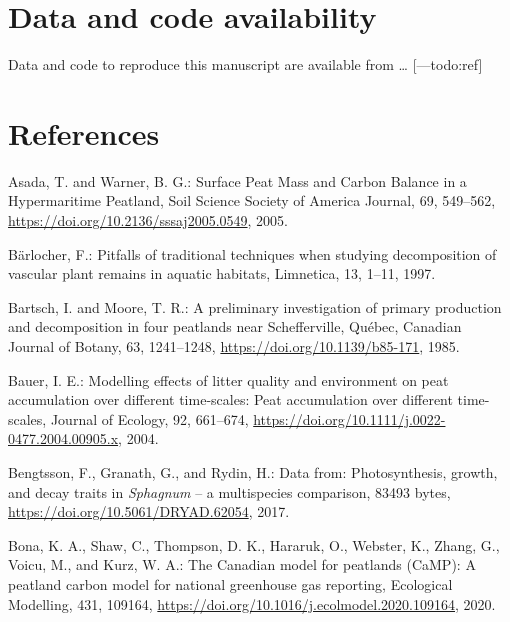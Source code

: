 \documentclass[
  12pt,
]{article}
\newlength{\cslhangindent}
\newlength{\cslentryspacingunit} %
\newenvironment{CSLReferences}[2] %
 {%
  \setlength{\parindent}{0pt}
  \ifodd #1
  \let\oldpar\par
  \def\par{\hangindent=\cslhangindent\oldpar}
  \fi
  \setlength{\parskip}{#2\cslentryspacingunit}
 }%
 {}
\begin{document}
\hypertarget{data-and-code-availability}{%
\section*{Data and code availability}\label{data-and-code-availability}}

Data and code to reproduce this manuscript are available from \ldots{} {[}---todo:ref{]}

\hypertarget{references}{%
\section*{References}\label{references}}

\hypertarget{refs}{}
\begin{CSLReferences}{0}{0}
\leavevmode{}%
Asada, T. and Warner, B. G.: Surface {Peat Mass} and {Carbon Balance} in a {Hypermaritime Peatland}, Soil Science Society of America Journal, 69, 549--562, \url{https://doi.org/10.2136/sssaj2005.0549}, 2005.

\leavevmode{}%
Bärlocher, F.: Pitfalls of traditional techniques when studying decomposition of vascular plant remains in aquatic habitats, Limnetica, 13, 1--11, 1997.

\leavevmode{}%
Bartsch, I. and Moore, T. R.: A preliminary investigation of primary production and decomposition in four peatlands near {Schefferville}, {Qu{é}bec}, Canadian Journal of Botany, 63, 1241--1248, \url{https://doi.org/10.1139/b85-171}, 1985.

\leavevmode{}%
Bauer, I. E.: Modelling effects of litter quality and environment on peat accumulation over different time-scales: {Peat} accumulation over different time-scales, Journal of Ecology, 92, 661--674, \url{https://doi.org/10.1111/j.0022-0477.2004.00905.x}, 2004.

\leavevmode{}%
Bengtsson, F., Granath, G., and Rydin, H.: Data from: {Photosynthesis}, growth, and decay traits in {\emph{Sphagnum}} -- a multispecies comparison, 83493 bytes, \url{https://doi.org/10.5061/DRYAD.62054}, 2017.

\leavevmode{}%
Bona, K. A., Shaw, C., Thompson, D. K., Hararuk, O., Webster, K., Zhang, G., Voicu, M., and Kurz, W. A.: The {Canadian} model for peatlands ({CaMP}): {A} peatland carbon model for national greenhouse gas reporting, Ecological Modelling, 431, 109164, \url{https://doi.org/10.1016/j.ecolmodel.2020.109164}, 2020.


\end{CSLReferences}
\end{document}

